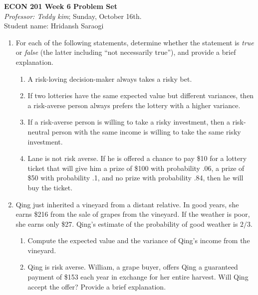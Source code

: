 \documentclass[11pt]{article}
\begin{document}
\begin{center}
\textbf{ECON 201 Week 6 Problem Set}\\
\textit {Professor: Teddy kim};  
Sunday, October 16th.
\\Student name: Hridansh Saraogi
\end{center}

\begin{enumerate}
\item For each of the following statements, determine whether
the statement is \emph{true} or \emph{false} (the latter including ``not necessarily true''), and provide a brief explanation.

    \begin{enumerate}
   	\item A risk-loving decision-maker always takes a risky bet.
	
	\item If two lotteries have the same expected value but different variances, then a risk-averse person always prefers the lottery with a higher variance.

    \item If a risk-averse person is willing to take a risky investment, then a risk-neutral person with the same income is willing to take the same risky investment.

    \item Lane is not risk averse. If he is offered a chance to pay \$10 for a lottery ticket that will give him a prize of \$100 with probability .06, a prize of \$50 with probability .1, and no prize with probability .84, then he will buy the ticket.

    \end{enumerate}

\item Qing just inherited a vineyard from a distant relative. In good years, she earns \$216 from the sale of grapes from the vineyard. If the weather is poor, she earns only \$27. Qing's estimate of the probability of good weather is $2/3$.
	\begin{enumerate}
	\item Compute the expected value and the variance of Qing's income from the vineyard.
	
	\item Qing is risk averse. William, a grape buyer, offers Qing a guaranteed payment of \$153 each year in exchange for her entire harvest. Will Qing accept the offer? Provide a brief explanation.
	

\end{enumerate}
\end{enumerate}
\end{document}
